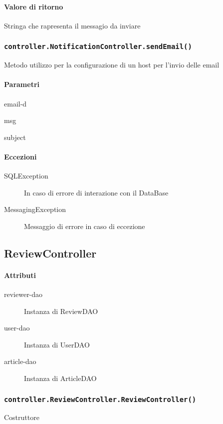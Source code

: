 \paragraph{Valore di ritorno}
Stringa che rapresenta il messagio da inviare

\subsubsection{\texttt{controller.NotificationController.sendEmail()}}
Metodo utilizzo per la configurazione di un host per l'invio delle email
\paragraph{Parametri}
\begin{description}
\item email-d
\item msg
\item subject
\end{description}
\paragraph{Eccezioni}
\begin{description}
\item[SQLException] In caso di errore di interazione con il DataBase
\item[MessagingException] Messaggio di errore in caso di eccezione
\end{description}


\subsection{ReviewController}
\paragraph{Attributi}
\begin{description}
\item[reviewer-dao] Instanza di ReviewDAO
\item[user-dao] Instanza di UserDAO
\item[article-dao] Instanza di ArticleDAO
\end{description}

\subsubsection{\texttt{controller.ReviewController.ReviewController()}}
Costruttore
